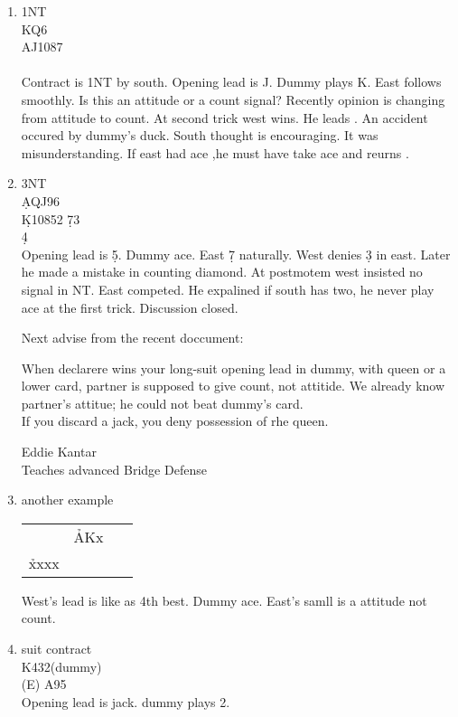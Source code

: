 \begin{enumerate}
\item{ 1NT\\
\qquad \qquad \s KQ6\\
\s AJ1087 \qquad {}\\
\qquad \qquad {}\\

Contract is 1NT by south. Opening lead is \s J. Dummy plays \s K.
East follows  smoothly. Is this an attitude or a count signal?
Recently opinion is changing from attitude to count.
At second trick west wins. He leads . An accident occured by
dummy's duck. South thought  is encouraging. It was misunderstanding.
If east had ace ,he must have take ace and reurns .

}

\item{ 3NT\\
\qquad \qquad \d AQJ96\\
\d K10852 \qquad \d 73\\
\qquad \qquad \d 4\\
Opening lead is \d 5. Dummy ace. East \d 7 naturally.
West denies \d 3 in east.  Later he made a mistake in
counting diamond. At postmotem west insisted no signal
in NT. East competed. He expalined if south has two,
he never play ace at the first trick. Discussion closed.

Next advise from the  recent doccument:

When declarere wins your long-suit opening lead in dummy,
with queen or a lower card, partner is supposed to
give count, not attitide. We already know partner's attitue;
he could not beat dummy's card.\\
If you discard a jack, you deny possession of rhe queen.
\begin{flushright}{
Eddie Kantar\\
Teaches advanced Bridge Defense}
\end{flushright}
}
\item{
another example\\
\begin{tabular}[t]{lll}
 \  & \h AKx       & \ \\
 \h xxxx & \ \ \ \  & \\
 \end{tabular}

West's lead is like as 4th best. Dummy ace. East's
samll is a attitude not count.



}


\item{ suit contract\\
\qquad \qquad K432(dummy)\\
\qquad \qquad \qquad (E) A95\\
Opening lead is jack. dummy plays 2.
}
\end{enumerate}


